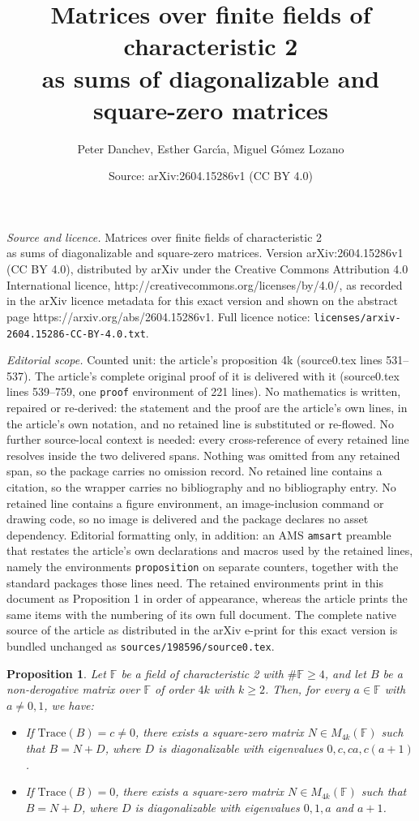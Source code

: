 \documentclass[10pt,a4paper]{amsart}
\title{Matrices over finite fields of characteristic 2 \\ as sums of diagonalizable and square-zero matrices}
\author{Peter Danchev, Esther Garc\'\i a, Miguel G\'omez Lozano}
\date{Source: arXiv:2604.15286v1 (CC BY 4.0)}
\newtheorem{proposition}{Proposition}
\def\FF{\mathbb{F}}
\begin{document}
\maketitle

\noindent\emph{Source and licence.} Matrices over finite fields of characteristic 2 \\ as sums of diagonalizable and square-zero matrices. Version arXiv:2604.15286v1 (CC BY 4.0), distributed by arXiv under the Creative Commons Attribution 4.0 International licence, http://creativecommons.org/licenses/by/4.0/, as recorded in the arXiv licence metadata for this exact version and shown on the abstract page https://arxiv.org/abs/2604.15286v1. Full licence notice: \texttt{licenses/arxiv-2604.15286-CC-BY-4.0.txt}.\par\smallskip

\noindent\textit{Editorial scope.} Counted unit: the article's proposition 4k (source0.tex lines 531--537). The article's complete original proof of it is delivered with it (source0.tex lines 539--759, one \texttt{proof} environment of 221 lines). No mathematics is written, repaired or re-derived: the statement and the proof are the article's own lines, in the article's own notation, and no retained line is substituted or re-flowed.  No further source-local context is needed: every cross-reference of every retained line resolves inside the two delivered spans.  Nothing was omitted from any retained span, so the package carries no omission record.  No retained line contains a citation, so the wrapper carries no bibliography and no bibliography entry.  No retained line contains a figure environment, an image-inclusion command or drawing code, so no image is delivered and the package declares no asset dependency.  Editorial formatting only, in addition: an AMS \texttt{amsart} preamble that restates the article's own declarations and macros used by the retained lines, namely the environments \texttt{proposition} on separate counters, together with the standard packages those lines need.  The retained environments print in this document as Proposition 1 in order of appearance, whereas the article prints the same items with the numbering of its own full document.  The complete native source of the article as distributed in the arXiv e-print for this exact version is bundled unchanged as \texttt{sources/198596/source0.tex}.
\begin{proposition}\label{4k}
Let $\FF$ be a field of characteristic 2 with $\#\FF\ge4$, and let $B$ be a non-derogative matrix over $\FF$ of order $4k$ with $k\ge 2$. Then, for every $a\in \FF$ with $a\ne 0,1$, we have:
  \begin{itemize}
\item[(a)] If $\text{Trace}(B)=c\ne 0$, there exists a square-zero matrix $N\in {M}_{4k}(\FF)$ such that $B=N+D$, where $D$ is diagonalizable with eigenvalues $0, c, ca,c(a+1)$.
\item[(b)] If $\text{Trace}(B)=0$, there exists a square-zero matrix $N\in {M}_{4k}(\FF)$ such that $B=N+D$, where $D$ is diagonalizable with eigenvalues $0,1,a$ and $a+1$.
  \end{itemize}
\end{proposition}
\end{document}
